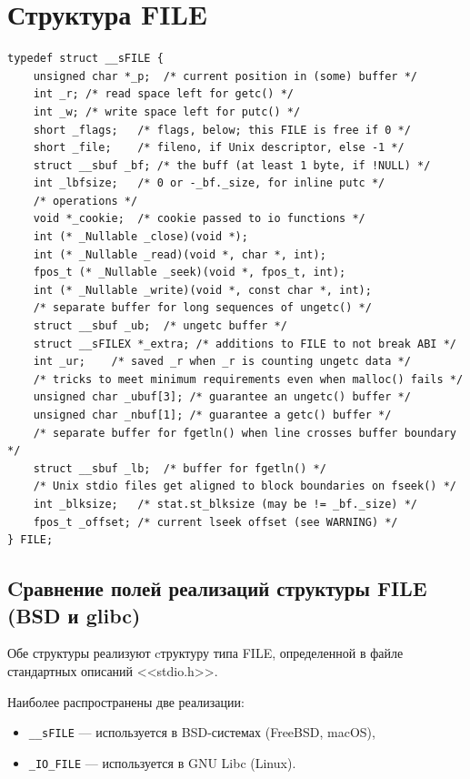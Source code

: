 \section{Структура FILE}

\begin{lstlisting}[caption=Описание структуры FILE (\_\_sFILE),label=lst:FILEstruct1]
typedef struct __sFILE {
	unsigned char *_p;	/* current position in (some) buffer */
	int _r;	/* read space left for getc() */
	int _w;	/* write space left for putc() */
	short _flags;	/* flags, below; this FILE is free if 0 */
	short _file;	/* fileno, if Unix descriptor, else -1 */
	struct __sbuf _bf; /* the buff (at least 1 byte, if !NULL) */
	int _lbfsize;	/* 0 or -_bf._size, for inline putc */
	/* operations */
	void *_cookie;	/* cookie passed to io functions */
	int (* _Nullable _close)(void *);
	int (* _Nullable _read)(void *, char *, int);
	fpos_t (* _Nullable _seek)(void *, fpos_t, int);
	int (* _Nullable _write)(void *, const char *, int);
	/* separate buffer for long sequences of ungetc() */
	struct __sbuf _ub;	/* ungetc buffer */
	struct __sFILEX *_extra; /* additions to FILE to not break ABI */
	int _ur;	/* saved _r when _r is counting ungetc data */
	/* tricks to meet minimum requirements even when malloc() fails */
	unsigned char _ubuf[3];	/* guarantee an ungetc() buffer */
	unsigned char _nbuf[1];	/* guarantee a getc() buffer */
	/* separate buffer for fgetln() when line crosses buffer boundary */
	struct __sbuf _lb;	/* buffer for fgetln() */
	/* Unix stdio files get aligned to block boundaries on fseek() */
	int _blksize;	/* stat.st_blksize (may be != _bf._size) */
	fpos_t _offset;	/* current lseek offset (see WARNING) */
} FILE;
\end{lstlisting}

\subsection*{Cравнение полей реализаций структуры FILE (BSD и glibc)}

Обе структуры реализуют cтруктуру типа FILE, определенной в файле стандартных описаний <<stdio.h>>.

Наиболее распространены две реализации:
\begin{itemize}
	\item \texttt{\_\_sFILE} — используется в BSD-системах (FreeBSD, macOS),
	\item \texttt{\_IO\_FILE} — используется в GNU Libc (Linux).
\end{itemize}

